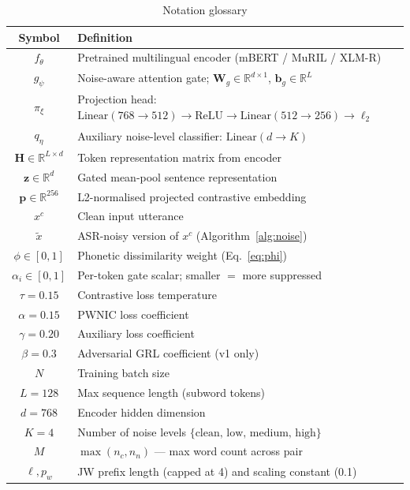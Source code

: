 \documentclass[12pt,a4paper]{report}
\newcommand{\R}{\mathbb{R}}
\begin{document}
\begin{table}[H]
\centering
\caption{Notation glossary}
\label{tab:notation}
\small
\begin{tabular}{cp{9cm}}
\toprule
\textbf{Symbol} & \textbf{Definition}\\
\midrule
$f_\theta$ & Pretrained multilingual encoder (mBERT / MuRIL / XLM-R) \\
$g_\psi$ & Noise-aware attention gate; $\mathbf{W}_g \in \R^{d\times 1}$, $\mathbf{b}_g \in \R^L$ \\
$\pi_\xi$ & Projection head: $\mathrm{Linear}(768{\to}512) \to \mathrm{ReLU} \to \mathrm{Linear}(512{\to}256) \to \ell_2$ \\
$q_\eta$ & Auxiliary noise-level classifier: $\mathrm{Linear}(d \to K)$ \\
$\mathbf{H} \in \R^{L\times d}$ & Token representation matrix from encoder \\
$\mathbf{z} \in \R^d$ & Gated mean-pool sentence representation \\
$\mathbf{p} \in \R^{256}$ & L2-normalised projected contrastive embedding \\
$x^c$ & Clean input utterance \\
$\tilde{x}$ & ASR-noisy version of $x^c$ (Algorithm~\ref{alg:noise}) \\
$\phi \in [0,1]$ & Phonetic dissimilarity weight (Eq.~\eqref{eq:phi}) \\
$\alpha_i \in [0,1]$ & Per-token gate scalar; smaller $=$ more suppressed \\
$\tau = 0.15$ & Contrastive loss temperature \\
$\alpha = 0.15$ & PWNIC loss coefficient \\
$\gamma = 0.20$ & Auxiliary loss coefficient \\
$\beta = 0.3$ & Adversarial GRL coefficient (v1 only) \\
$N$ & Training batch size \\
$L = 128$ & Max sequence length (subword tokens) \\
$d = 768$ & Encoder hidden dimension \\
$K = 4$ & Number of noise levels $\{\text{clean, low, medium, high}\}$ \\
$M$ & $\max(n_c, n_n)$ --- max word count across pair \\
$\ell, p_w$ & JW prefix length (capped at 4) and scaling constant (0.1) \\
\bottomrule
\end{tabular}
\end{table}
\end{document}
